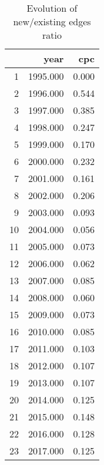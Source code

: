 \begin{table}[ht]
\centering
\begin{tabular}{rrr}
  \hline
 & year & cpc \\ 
  \hline
1 & 1995.000 & 0.000 \\ 
  2 & 1996.000 & 0.544 \\ 
  3 & 1997.000 & 0.385 \\ 
  4 & 1998.000 & 0.247 \\ 
  5 & 1999.000 & 0.170 \\ 
  6 & 2000.000 & 0.232 \\ 
  7 & 2001.000 & 0.161 \\ 
  8 & 2002.000 & 0.206 \\ 
  9 & 2003.000 & 0.093 \\ 
  10 & 2004.000 & 0.056 \\ 
  11 & 2005.000 & 0.073 \\ 
  12 & 2006.000 & 0.062 \\ 
  13 & 2007.000 & 0.085 \\ 
  14 & 2008.000 & 0.060 \\ 
  15 & 2009.000 & 0.073 \\ 
  16 & 2010.000 & 0.085 \\ 
  17 & 2011.000 & 0.103 \\ 
  18 & 2012.000 & 0.107 \\ 
  19 & 2013.000 & 0.107 \\ 
  20 & 2014.000 & 0.125 \\ 
  21 & 2015.000 & 0.148 \\ 
  22 & 2016.000 & 0.128 \\ 
  23 & 2017.000 & 0.125 \\ 
   \hline
\end{tabular}
\caption{Evolution of new/existing edges ratio} 
\end{table}
